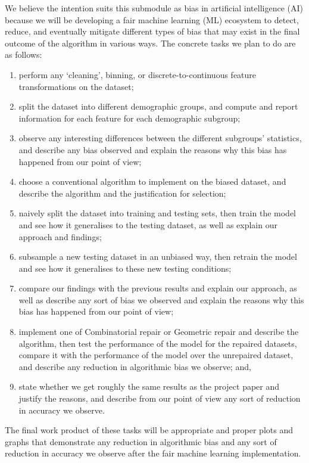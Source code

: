 \documentclass[conference]{IEEEtran}
\begin{document}
We believe the intention suits this submodule as bias in artificial intelligence (AI) because we will be developing a fair machine learning (ML) ecosystem to detect, reduce, and eventually mitigate different types of bias that may exist in the final outcome of the algorithm in various ways. The concrete tasks we plan to do are as follows:
\begin{enumerate}
    \item perform any `cleaning', binning, or discrete-to-continuous feature transformations on the dataset;
    \item split the dataset into different demographic groups, and compute and report information for each feature for each demographic subgroup;
    \item observe any interesting differences between the different subgroups’ statistics, and describe any bias observed and explain the reasons why this bias has happened from our point of view;
    \item choose a conventional algorithm to implement on the biased dataset, and describe the algorithm and the justification for selection;
    \item naively split the dataset into training and testing sets, then train the model and see how it generalises to the testing dataset, as well as explain our approach and findings;
    \item subsample a new testing dataset in an unbiased way, then retrain the model and see how it generalises to these new testing conditions; 
    \item compare our findings with the previous results and explain our approach, as well as describe any sort of bias we observed and explain the reasons why this bias has happened from our point of view;
    \item implement one of Combinatorial repair or Geometric repair and describe the algorithm, then test the performance of the model for the repaired datasets, compare it with the performance of the model over the unrepaired dataset, and describe any reduction in algorithmic bias we observe; and,
    \item state whether we get roughly the same results as the project paper and justify the reasons, and describe from our point of view any sort of reduction in accuracy we observe.
\end{enumerate}
The final work product of these tasks will be appropriate and proper plots and graphs that demonstrate any reduction in algorithmic bias and any sort of reduction in accuracy we observe after the fair machine learning implementation.
\end{document}
